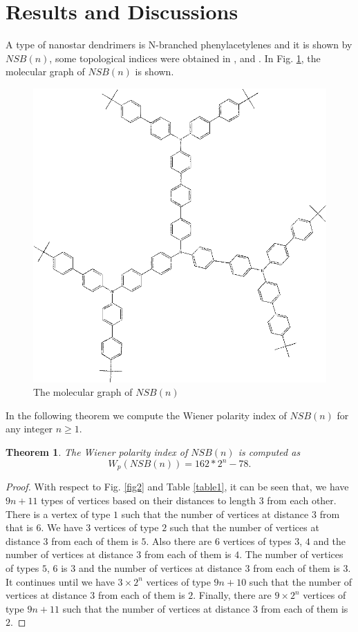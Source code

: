 \documentclass[12pt]{article}
\theoremstyle{theorem}
\newtheorem{theorem}{Theorem}
\theoremstyle{defi}
\begin{document}
\section{Results and Discussions}

 A type of nanostar dendrimers is N-branched phenylacetylenes and it is shown by $NSB(n)$, some topological indices were obtained in \cite{21} , \cite{22} and \cite{23}. In Fig. \ref{fig1}, the molecular graph of $NSB(n)$ is shown. 
\begin{figure}
\label{fig1}
\centering
\includegraphics[width=0.7\linewidth]{img1}
\caption{The molecular graph of $NSB(n)$}
\end{figure}

In the following theorem we compute the Wiener polarity index of $NSB(n)$ for any integer $n\geq 1$.
\begin{theorem}
The Wiener polarity index of $NSB(n)$ is computed as
$$
W_p(NSB(n))= 162*2^n - 78.
$$
\end{theorem}
\begin{proof}
With respect to Fig. \ref{fig2} and Table \ref{table1}, it can be seen that, we have $9n + 11$ types of vertices based on their distances to length $3$ from each other. There is a vertex of type $1$ such that the number of vertices at distance $3$ from that is $6$. We have $3$ vertices of type $2$ such that the number of vertices at distance $3$ from each of them is $5$. Also there are $6$ vertices of types $3$, $4$ and the number of vertices at distance $3$ from each of them is $4$. The number of vertices of types $5$, $6$ is $3$ and the number of vertices at distance $3$ from each of them is $3$. It continues until we have $3\times 2^n$ vertices of type $9n + 10$ such that the number of vertices at distance $3$ from each of them is $2$. Finally, there are $9\times 2^n$ vertices of type $9n + 11$ such that the number of vertices at distance $3$ from each of them is $2$.
\end{proof}
\end{document}
